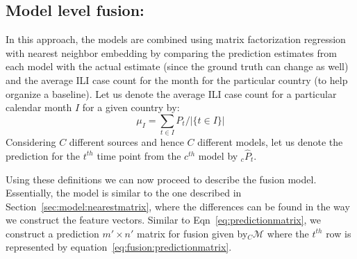 \subsection{\label{sec:fusion:model} Model level fusion:}
In this approach, the models are combined using matrix factorization regression with 
nearest neighbor embedding by comparing the
prediction estimates from each model with the actual estimate (since the ground truth
can change as well) and the average
ILI case count for the month for the particular country (to help organize a baseline).
Let us denote the average ILI case count for a particular calendar 
month $I$ for a given country by:
\[
  \mu_I = \sum_{t \in I}P_{t}/{|\lbrace t \in I\rbrace|}
\]
\noindent
Considering $C$ different sources and hence $C$ different models, 
let us denote the prediction for the $t^{th}$ time point 
from the $c^{th}$ model by ${}_c\widehat{P}_t$.

Using these definitions we can now proceed to describe the fusion 
model. Essentially, the model is similar to the one described in 
Section~\ref{sec:model:nearestmatrix}, where the differences can be
found in 
the way we construct the feature vectors. Similar to Eqn~\ref{eq:predictionmatrix},
we construct a prediction  $m'\times n'$ matrix for fusion given by${}_C\mathcal{M}$ where 
the $t^{th}$ row is represented by equation~\ref{eq:fusion:predictionmatrix}.

